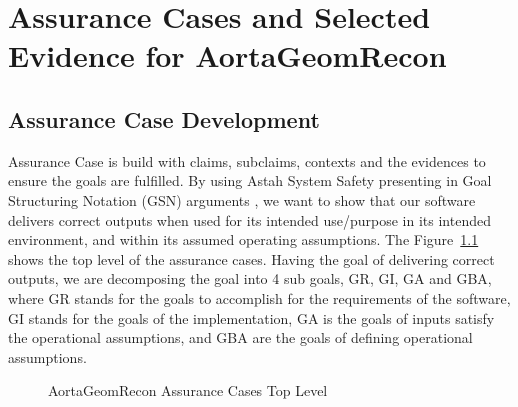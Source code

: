 \chapter{Assurance Cases and Selected Evidence for AortaGeomRecon}

\section{Assurance Case Development}

Assurance Case is build with claims, subclaims, contexts and the evidences to ensure the goals are fulfilled. By using Astah System Safety presenting in Goal Structuring Notation (GSN) arguments \cite{Astah_2023}\cite{kelly2004goal}, we want to show that our software delivers correct outputs when used for its intended use/purpose in its intended environment, and within its assumed operating assumptions. The Figure~\ref{fig_agr_ac_top} shows the top level of the assurance cases. Having the goal of delivering correct outputs, we are decomposing the goal into 4 sub goals, GR, GI, GA and GBA, where GR stands for the goals to accomplish for the requirements of the software, GI stands for the goals of the implementation, GA is the goals of inputs satisfy the operational assumptions, and GBA are the goals of defining operational assumptions. 

\begin{figure}[H]
    \centering
    \caption[AortaGeomRecon Assurance Cases Top Level]{AortaGeomRecon Assurance Cases Top Level}
    \label{fig_agr_ac_top}
\end{figure}


